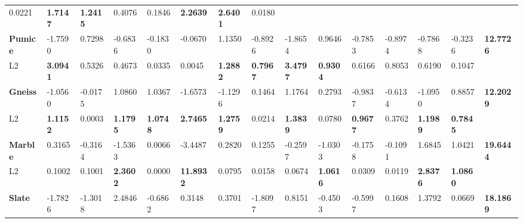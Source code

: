 \begin{landscape}
\begin{table}[H]
{\begin{tabular}{@{}lllllllllllllll@{}}
  0.0221 &
  \cellcolor[HTML]{FFC000}\textbf{1.7147} &
  \cellcolor[HTML]{FFD966}\textbf{1.2415} &
  0.4076 &
  0.1846 &
  \cellcolor[HTML]{FCE4D6}\textbf{2.2639} &
  \cellcolor[HTML]{F8CBAD}\textbf{2.6401} &
  0.0180 &
  \textbf{} \\
\rowcolor[HTML]{E7E6E6} 
\textbf{Pumice} &
  -1.7590 &
  0.7298 &
  -0.6836 &
  -0.1830 &
  -0.0670 &
  1.1350 &
  -0.8926 &
  -1.8654 &
  0.9646 &
  -0.7853 &
  -0.8974 &
  -0.7868 &
  -0.3236 &
  \textbf{12.7726} \\
L2 &
  \cellcolor[HTML]{F4B084}\textbf{3.0941} &
  \cellcolor[HTML]{FFF2CC}0.5326 &
  0.4673 &
  0.0335 &
  0.0045 &
  \cellcolor[HTML]{FFD966}\textbf{1.2882} &
  \cellcolor[HTML]{FFF2CC}\textbf{0.7967} &
  \cellcolor[HTML]{F4B084}\textbf{3.4797} &
  \cellcolor[HTML]{FFF2CC}\textbf{0.9304} &
  \cellcolor[HTML]{FFF2CC}0.6166 &
  \cellcolor[HTML]{FFF2CC}0.8053 &
  \cellcolor[HTML]{FFF2CC}0.6190 &
  0.1047 &
  \textbf{} \\
\rowcolor[HTML]{E7E6E6} 
\textbf{Gneiss} &
  -1.0560 &
  -0.0175 &
  1.0860 &
  1.0367 &
  -1.6573 &
  -1.1296 &
  0.1464 &
  1.1764 &
  0.2793 &
  -0.9837 &
  -0.6134 &
  -1.0950 &
  0.8857 &
  \textbf{12.2029} \\
L2 &
  \cellcolor[HTML]{FFD966}\textbf{1.1152} &
  0.0003 &
  \cellcolor[HTML]{FFD966}\textbf{1.1795} &
  \cellcolor[HTML]{FFD966}\textbf{1.0748} &
  \cellcolor[HTML]{F8CBAD}\textbf{2.7465} &
  \cellcolor[HTML]{FFD966}\textbf{1.2759} &
  0.0214 &
  \cellcolor[HTML]{FFD966}\textbf{1.3839} &
  0.0780 &
  \cellcolor[HTML]{FFF2CC}\textbf{0.9677} &
  0.3762 &
  \cellcolor[HTML]{FFD966}\textbf{1.1989} &
  \cellcolor[HTML]{FFF2CC}\textbf{0.7845} &
  \textbf{} \\
\rowcolor[HTML]{E7E6E6} 
\textbf{Marble} &
  0.3165 &
  -0.3164 &
  -1.5363 &
  0.0066 &
  -3.4487 &
  0.2820 &
  0.1255 &
  -0.2597 &
  -1.0303 &
  -0.1758 &
  -0.1091 &
  1.6845 &
  1.0421 &
  \textbf{19.6444} \\
L2 &
  0.1002 &
  0.1001 &
  \cellcolor[HTML]{FCE4D6}\textbf{2.3602} &
  0.0000 &
  \cellcolor[HTML]{ED7D31}\textbf{11.8932} &
  0.0795 &
  0.0158 &
  0.0674 &
  \cellcolor[HTML]{FFD966}\textbf{1.0616} &
  0.0309 &
  0.0119 &
  \cellcolor[HTML]{F8CBAD}\textbf{2.8376} &
  \cellcolor[HTML]{FFD966}\textbf{1.0860} &
  \textbf{} \\
\rowcolor[HTML]{E7E6E6} 
\textbf{Slate} &
  -1.7826 &
  -1.3018 &
  2.4846 &
  -0.6862 &
  0.3148 &
  0.3701 &
  -1.8097 &
  0.8151 &
  -0.4503 &
  -0.5997 &
  0.1608 &
  1.3792 &
  0.0669 &
  \textbf{18.1869} \\

\end{tabular}}
\end{table}
\end{landscape}

